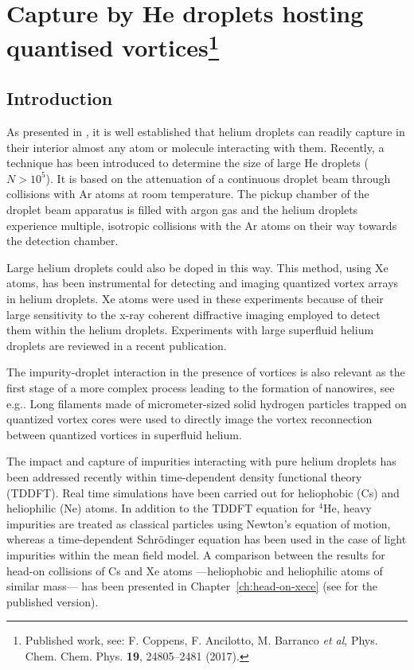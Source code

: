 \chapter{Capture by He droplets hosting quantised vortices\footnote{Published work, see: F. Coppens, F. Ancilotto, M. Barranco \emph{et al}, Phys. Chem. Chem. Phys. \textbf{19}, 24805--2481 (2017).}}\label{ch:capture}
	\section{Introduction}
		As presented in , it is well established that helium droplets can readily capture in their interior almost any atom or molecule interacting with them. Recently, a technique has been introduced to determine the size of large He droplets ($N> 10^5$). It is based on the attenuation of a continuous droplet beam through collisions with Ar atoms at room temperature\citep{Gom11}. The pickup chamber of the droplet beam apparatus is filled with argon gas and the helium droplets experience multiple, isotropic collisions with the Ar atoms on their way towards the detection chamber. 

		Large helium droplets could also be doped in this way. This method, using Xe atoms, has been instrumental for detecting and imaging quantized vortex arrays in helium droplets\citep{Gom14,Jones2016}. Xe atoms were used in these experiments because of their large sensitivity to the x-ray coherent diffractive imaging employed to detect them within the helium droplets. Experiments with large superfluid helium droplets are reviewed in a recent publication\citep{Tan17}.

		The impurity-droplet interaction in the presence of vortices is also relevant as the first stage of a more complex process leading to the formation of nanowires, see e.g.. Long filaments made of micrometer-sized solid hydrogen particles trapped on quantized vortex cores were used to directly image the vortex reconnection between quantized vortices in superfluid helium\citep{Bewley2008}.

		The impact and capture of impurities interacting with pure helium droplets has been addressed recently within time-dependent density functional theory (TDDFT).
Real time simulations have been carried out for 
heliophobic\citep{Lea14a} (Cs) and heliophilic\citep{Vil16b} (Ne) atoms. In addition to the 
TDDFT equation for $^4$He, heavy impurities are treated as 
classical particles using
Newton's equation of motion, whereas a time-dependent 
Schr\"odinger equation has been used in the case of  
light impurities within the mean field model\citep{Her12a,Vil16b}.  
A comparison between the results for head-on collisions of Cs and Xe 
atoms ---heliophobic and heliophilic atoms of similar mass--- has been presented in Chapter~\ref{ch:head-on-xece} (see for the published version).

